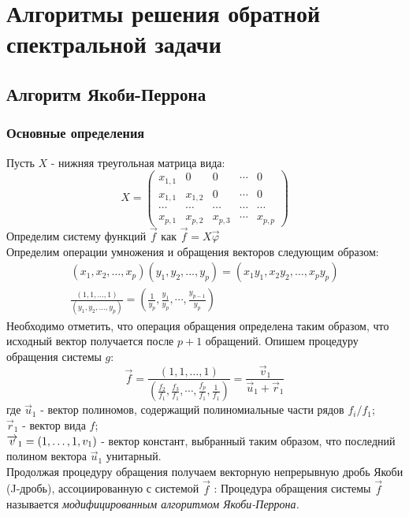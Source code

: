 \section{Алгоритмы решения обратной спектральной задачи}
\subsection{Алгоритм Якоби-Перрона}
\subsubsection{Основные определения}
Пусть $X$ - нижняя треугольная матрица вида:
$$%
X=\left(
\begin{array} {cccccc}
x_{1,1} & 0       & 0       & \cdots & 0\\
x_{1,1} & x_{1,2} & 0       & \cdots & 0\\
\cdots  & \cdots  & \cdots  & \cdots & \cdots\\
x_{p,1} & x_{p,2} & x_{p,3} & \cdots & x_{p,p}
\end{array}
\right)
$$%
Определим систему функций $\overrightarrow{f}$ как
$\overrightarrow{f}=X\overrightarrow{\varphi}$ \\
Определим операции умножения и обращения векторов следующим
образом:
\begin{eqnarray}
(x_1,x_2,\ldots,x_p)(y_1,y_2,\ldots,y_p)=(x_1y_1,x_2y_2,\ldots,x_py_p)\nonumber\\
\frac{(1,1,\ldots,1)}{(y_1,y_2,\ldots,y_p)}= \left(
\frac{1}{y_p},\frac{y_1}{y_p},\cdots,\frac{y_{p-1}}{y_p}
\right)\nonumber
\end{eqnarray}
Необходимо отметить, что операция обращения определена таким
образом, что исходный вектор получается после $p+1$ обращений.
Опишем процедуру обращения системы $g$:
$$%
\overrightarrow{f}= \frac{(1,1,\ldots,1)} { \left( \displaystyle{
\frac{f_2}{f_1},\frac{f_3}{f_1},\cdots,\frac{f_p}{f_1},\frac{1}{f_1}
} \right) } = \frac{\overrightarrow{v}_1}
{\overrightarrow{u}_1+\overrightarrow{r}_1}
$$%
где $\overrightarrow{u}_1$ - вектор полиномов, содержащий полиномиальные части рядов ${f_i/f_1}$;\\
$\overrightarrow{r}_1$ - вектор вида $f$;\\
$\overrightarrow{v}_1=(1,\ldots,1, v_1) \rm$ - вектор констант,
выбранный таким образом, что
последний полином вектора $\overrightarrow{u}_1$ унитарный.\\
Продолжая процедуру обращения получаем векторную непрерывную дробь
Якоби (J-дробь), ассоциированную с системой $\overrightarrow{f}$ :
Процедура обращения системы $\overrightarrow{f}$ называется \it
модифицированным алгоритмом Якоби-Перрона. \rm
